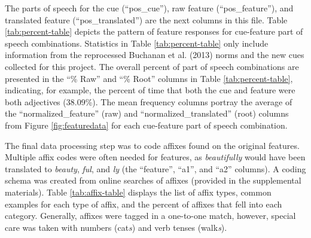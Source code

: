 \documentclass[english,,man]{apa6}
\begin{document}
The parts of speech for the cue (\enquote{pos\_cue}), raw feature (\enquote{pos\_feature}), and translated feature (\enquote{pos\_translated}) are the next columns in this file. Table \ref{tab:percent-table} depicts the pattern of feature responses for cue-feature part of speech combinations. Statistics in Table \ref{tab:percent-table} only include information from the reprocessed Buchanan et al. (2013) norms and the new cues collected for this project. The overall percent of part of speech combinations are presented in the \enquote{\% Raw} and \enquote{\% Root} columns in Table \ref{tab:percent-table}, indicating, for example, the percent of time that both the cue and feature were both adjectives (38.09\%). The mean frequency columns portray the average of the \enquote{normalized\_feature} (raw) and \enquote{normalized\_translated} (root) columns from Figure \ref{fig:featuredata} for each cue-feature part of speech combination.

The final data processing step was to code affixes found on the original features. Multiple affix codes were often needed for features, as \emph{beautifully} would have been translated to \emph{beauty}, \emph{ful}, and \emph{ly} (the \enquote{feature}, \enquote{a1}, and \enquote{a2} columns). A coding schema was created from online searches of affixes (provided in the supplemental materials). Table \ref{tab:affix-table} displays the list of affix types, common examples for each type of affix, and the percent of affixes that fell into each category. Generally, affixes were tagged in a one-to-one match, however, special care was taken with numbers (cat\emph{s}) and verb tenses (walk\emph{s}).
\end{document}
